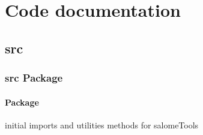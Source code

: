 \documentclass[a4paper,10pt,english]{sphinxmanual}
\begin{document}
\chapter{Code documentation}
\label{\detokenize{index:code-documentation}}

\section{src}
\label{\detokenize{commands/apidoc/modules:src}}\label{\detokenize{commands/apidoc/modules::doc}}

\subsection{src Package}
\label{\detokenize{commands/apidoc/src::doc}}\label{\detokenize{commands/apidoc/src:src-package}}

\subsubsection{ Package}
\label{\detokenize{commands/apidoc/src:id1}}\label{\detokenize{commands/apidoc/src:module-src.__init__}}
initial imports and utilities methods for salomeTools
\end{document}
